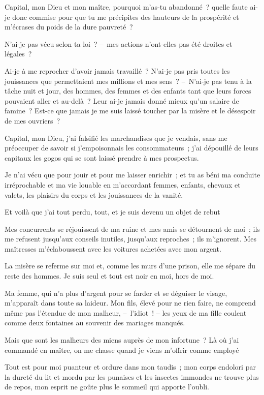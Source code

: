 \documentclass[french,twoside]{book} %
\newcommand\chaptercont{} %
\begin{document}
\chaptercont
\noindent Capital, mon Dieu et mon maître, pourquoi m’as-tu abandonné ? quelle faute ai-je donc commise pour que tu me précipites des hauteurs de la prospérité et m’écrases du poids de la dure pauvreté ?\par
N'ai-je pas vécu selon ta loi ? – mes actions n’ont-elles pas été droites et légales ?\par
Ai-je à me reprocher d’avoir jamais travaillé ? N'ai-je pas pris toutes les jouissances que permettaient mes millions et mes sens ? – N'ai-je pas tenu à la tâche nuit et jour, des hommes, des femmes et des enfants tant que leurs forces pouvaient aller et au-delà ? Leur ai-je jamais donné mieux qu’un salaire de famine ? Est-ce que jamais je me suis laissé toucher par la misère et le désespoir de mes ouvriers ?\par
Capital, mon Dieu, j’ai falsifié les marchandises que je vendais, sans me préoccuper de savoir si j’empoisonnais les consommateurs ; j’ai dépouillé de leurs capitaux les gogos qui se sont laissé prendre à mes prospectus.\par
Je n’ai vécu que pour jouir et pour me laisser enrichir ; et tu as béni ma conduite irréprochable et ma vie louable en m’accordant femmes, enfants, chevaux et valets, les plaisirs du corps et les jouissances de la vanité.\par
Et voilà que j’ai tout perdu, tout, et je suis devenu un objet de rebut\par
Mes concurrents se réjouissent de ma ruine et mes amis se détournent de moi ; ils me refusent jusqu’aux conseils inutiles, jusqu’aux reproches ; ils m’ignorent. Mes maîtresses m’éclaboussent avec les voitures achetées avec mon argent.\par
La misère se referme sur moi et, comme les murs d’une prison, elle me sépare du reste des hommes. Je suis seul et tout est noir en moi, hors de moi.\par
Ma femme, qui n’a plus d’argent pour se farder et se déguiser le visage, m’apparaît dans toute sa laideur. Mon fils, élevé pour ne rien faire, ne comprend même pas l’étendue de mon malheur, – l’idiot ! – les yeux de ma fille coulent comme deux fontaines au souvenir des mariages manqués.\par
Mais que sont les malheurs des miens auprès de mon infortune ? Là où j’ai commandé en maître, on me chasse quand je viens m’offrir comme employé\par
Tout est pour moi puanteur et ordure dans mon taudis ; mon corps endolori par la dureté du lit et mordu par les punaises et les insectes immondes ne trouve plus de repos, mon esprit ne goûte plus le sommeil qui apporte l’oubli.\par
\end{document}
